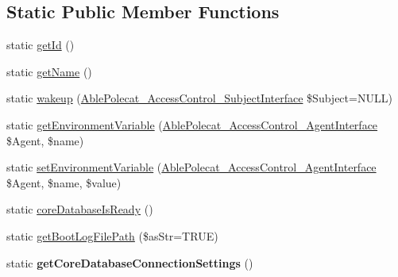 \subsection*{Static Public Member Functions}
\begin{DoxyCompactItemize}
\item 
static \hyperlink{class_able_polecat___mode___config_acfaa3a96d0cb5a4c0d4d710dcba41e9e}{get\+Id} ()
\item 
static \hyperlink{class_able_polecat___mode___config_a4ef9bd37ba3ce8a13c1e8bcf4f72a630}{get\+Name} ()
\item 
static \hyperlink{class_able_polecat___mode___config_a3f2135f6ad45f51d075657f6d20db2cd}{wakeup} (\hyperlink{interface_able_polecat___access_control___subject_interface}{Able\+Polecat\+\_\+\+Access\+Control\+\_\+\+Subject\+Interface} \$Subject=N\+U\+L\+L)
\item 
static \hyperlink{class_able_polecat___mode___config_a04e7e0f41da8037ae797868b61b6df77}{get\+Environment\+Variable} (\hyperlink{interface_able_polecat___access_control___agent_interface}{Able\+Polecat\+\_\+\+Access\+Control\+\_\+\+Agent\+Interface} \$Agent, \$name)
\item 
static \hyperlink{class_able_polecat___mode___config_a68bdefd00518f09963ea3fa95cd2a242}{set\+Environment\+Variable} (\hyperlink{interface_able_polecat___access_control___agent_interface}{Able\+Polecat\+\_\+\+Access\+Control\+\_\+\+Agent\+Interface} \$Agent, \$name, \$value)
\item 
static \hyperlink{class_able_polecat___mode___config_aa36943133d0afdd8efe4a026c3eec1b5}{core\+Database\+Is\+Ready} ()
\item 
static \hyperlink{class_able_polecat___mode___config_a98f25f25f60a178ec74bb6d61a2da394}{get\+Boot\+Log\+File\+Path} (\$as\+Str=T\+R\+U\+E)
\item 
\hypertarget{class_able_polecat___mode___config_a2eb991ebefbf1af0a620cdc6c109bf60}{}static {\bfseries get\+Core\+Database\+Connection\+Settings} ()\label{class_able_polecat___mode___config_a2eb991ebefbf1af0a620cdc6c109bf60}


\end{DoxyCompactItemize}
